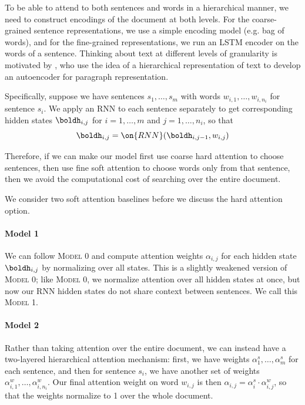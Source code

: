 \documentclass[12pt]{report}
\begin{document}
To be able to attend to both sentences and words in a hierarchical manner, we need to construct encodings of the document at both levels. For the coarse-grained sentence representations, we use a simple encoding model (e.g. bag of words), and for the fine-grained representations, we run an LSTM encoder on the words of a sentence.
Thinking about text at different levels of granularity is motivated by \citet{li2015autoencoder}, who use the idea of a hierarchical representation of text to develop an autoencoder for paragraph representation.


Specifically, suppose we have sentences $s_1, \ldots, s_m$ with words $w_{i,1}, \ldots, w_{i,n_i}$ for sentence $s_i$. We apply an RNN to each sentence separately to get corresponding hidden states $\boldh_{i,j}$ for $i = 1, \ldots, m$ and $j = 1, \ldots, n_i$, so that
\begin{equation}
\boldh_{i,j} = \on{RNN}(\boldh_{i,j-1}, w_{i,j})
\end{equation}


Therefore, if we can make our model first use coarse hard attention to choose sentences, then use fine soft attention to choose words only from that sentence, then we avoid the computational cost of searching over the entire document.

We consider two soft attention baselines before we discuss the hard attention option.

\paragraph{Model 1} We can follow \textsc{Model 0} and compute attention weights $\alpha_{i,j}$ for each hidden state $\boldh_{i,j}$ by normalizing over all states.
This is a slightly weakened version of \textsc{Model 0}; like \textsc{Model 0}, we normalize attention over all hidden states at once, but now our RNN hidden states do not share context between sentences. We call this \textsc{Model 1}.





\paragraph{Model 2} Rather than taking attention over the entire document, we can instead have a two-layered hierarchical attention mechanism: first, we have weights $\alpha_1^s, \ldots, \alpha_m^s$ for each sentence, and then for sentence $s_i$, we have another set of weights $\alpha_{i,1}^w, \ldots, \alpha_{i,n_i}^w$.
Our final attention weight on word $w_{i,j}$ is then $\alpha_{i,j} = \alpha_i^s \cdot \alpha_{i,j}^w$, so that the weights normalize to 1 over the whole document.
\end{document}
